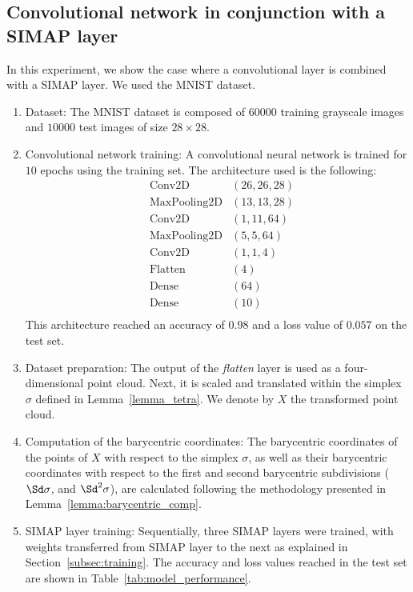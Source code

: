 \subsection{Convolutional network in conjunction with a SIMAP layer}

In this experiment, we  show
the case where a convolutional layer is combined with a SIMAP layer. 
We used the MNIST dataset.
\begin{enumerate}
    \item Dataset: The MNIST 
    dataset is composed of $60000$ training grayscale images and $10000$ test images of size $28\times 28$.
    \item Convolutional network training: A convolutional neural network is trained for $10$ epochs using the training set. 
    The architecture used is
       the following:
    \begin{align*}
&\text{Conv2D} & (26, 26, 28)  \\
&\text{MaxPooling2D} & (13, 13, 28)  \\
&\text{Conv2D} & (1, 11, 64)  \\
&\text{MaxPooling2D} & (5, 5, 64) \\
&\text{Conv2D} & (1, 1, 4)  \\
&\text{Flatten} & (4)  \\
&\text{Dense} & (64)  \\
&\text{Dense} & (10) \\
\end{align*}
This architecture reached an accuracy of $0.98$ and a loss value of $0.057$ on the test set.
\item Dataset preparation: The output of the {\it flatten} layer is used as a four-dimensional point cloud. Next, it is scaled and translated within the simplex $\sigma$ defined 
in Lemma~\ref{lemma_tetra}.
We denote by $X$ the transformed point cloud.
\item Computation of the barycentric coordinates: The barycentric coordinates of the points of $X$ with respect to the simplex $\sigma$, as well as their barycentric coordinates with respect to the first and second barycentric subdivisions ($\Sd \sigma$, and $\Sd^2 \sigma$), are calculated following the methodology presented in Lemma~\ref{lemma:barycentric_comp}.
\item SIMAP layer training: Sequentially, three SIMAP layers were trained, with weights transferred from 
SIMAP layer to the next as explained in Section~\ref{subsec:training}. The accuracy and loss values reached in the test set are shown in Table~\ref{tab:model_performance}.
\end{enumerate}


